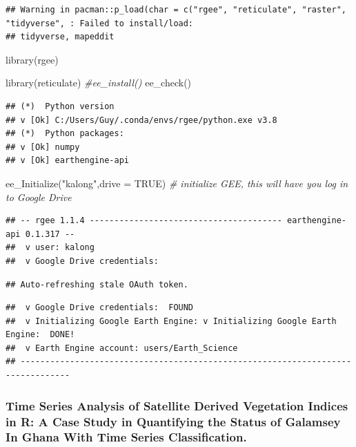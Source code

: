\documentclass[10pt]{report}
\newenvironment{Shaded}{\begin{snugshade}}{\end{snugshade}}
\newcommand{\AttributeTok}[1]{\textcolor[rgb]{0.77,0.63,0.00}{#1}}
\newcommand{\CommentTok}[1]{\textcolor[rgb]{0.56,0.35,0.01}{\textit{#1}}}
\newcommand{\ConstantTok}[1]{\textcolor[rgb]{0.00,0.00,0.00}{#1}}
\newcommand{\FunctionTok}[1]{\textcolor[rgb]{0.00,0.00,0.00}{#1}}
\newcommand{\NormalTok}[1]{#1}
\newcommand{\StringTok}[1]{\textcolor[rgb]{0.31,0.60,0.02}{#1}}
\begin{document}
\begin{verbatim}
## Warning in pacman::p_load(char = c("rgee", "reticulate", "raster", "tidyverse", : Failed to install/load:
## tidyverse, mapeddit
\end{verbatim}

\begin{Shaded}
\begin{Highlighting}[]
\FunctionTok{library}\NormalTok{(rgee)}

\FunctionTok{library}\NormalTok{(reticulate)}
\CommentTok{\#ee\_install()}
\FunctionTok{ee\_check}\NormalTok{()}
\end{Highlighting}
\end{Shaded}

\begin{verbatim}
## (*)  Python version
## v [Ok] C:/Users/Guy/.conda/envs/rgee/python.exe v3.8
## (*)  Python packages:
## v [Ok] numpy
## v [Ok] earthengine-api
\end{verbatim}

\begin{Shaded}
\begin{Highlighting}[]
\FunctionTok{ee\_Initialize}\NormalTok{(}\StringTok{"kalong"}\NormalTok{,}\AttributeTok{drive =} \ConstantTok{TRUE}\NormalTok{) }\CommentTok{\# initialize GEE, this will have you log in to Google Drive}
\end{Highlighting}
\end{Shaded}

\begin{verbatim}
## -- rgee 1.1.4 --------------------------------------- earthengine-api 0.1.317 -- 
##  v user: kalong 
##  v Google Drive credentials:
\end{verbatim}

\begin{verbatim}
## Auto-refreshing stale OAuth token.
\end{verbatim}

\begin{verbatim}
##  v Google Drive credentials:  FOUND
##  v Initializing Google Earth Engine: v Initializing Google Earth Engine:  DONE!
##  v Earth Engine account: users/Earth_Science 
## --------------------------------------------------------------------------------
\end{verbatim}

\hypertarget{time-series-analysis-of-satellite-derived-vegetation-indices-in-r-a-case-study-in-quantifying-the-status-of-galamsey-in-ghana-with-time-series-classification.}{%
\subsubsection{Time Series Analysis of Satellite Derived Vegetation
Indices in R: A Case Study in Quantifying the Status of Galamsey In
Ghana With Time Series
Classification.}\label{time-series-analysis-of-satellite-derived-vegetation-indices-in-r-a-case-study-in-quantifying-the-status-of-galamsey-in-ghana-with-time-series-classification.}}
\end{document}
